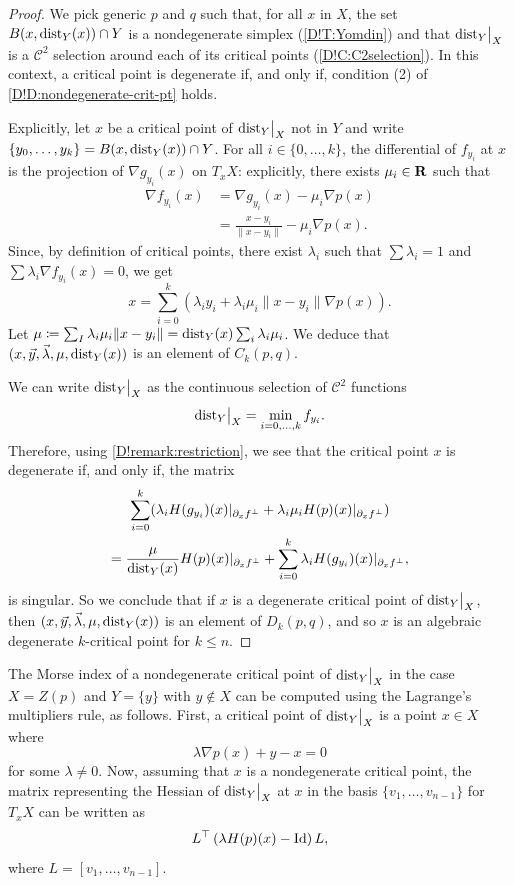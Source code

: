 \begin{proof}
  We pick generic $p$ and $q$ such that, for all $x$ in $X$, the set $B(x, \operatorname{dist}_Y(x)) \cap Y$ is a nondegenerate simplex (\cref{D!T:Yomdin}) and that $\mathord{\operatorname{dist}}_Y\big|_X$ is a $\mathcal{C}^2$ selection around each of its critical points (\cref{D!C:C2selection}). In this context, a critical point is degenerate if, and only if, condition (2) of \cref{D!D:nondegenerate-crit-pt} holds.

  Explicitly, let $x$ be a critical point of $\mathord{\operatorname{dist}}_Y\big|_X$ not in $Y$ and write $\{y_0, \ldots, y_k\} = B(x, \operatorname{dist}_Y(x)) \cap Y$. For all $i \in \{0, \ldots, k\}$, the differential of $f_{y_i}$ at $x$ is the projection of $\nabla g_{y_i}(x)$ on $T_x X$: explicitly, there exists $\mu_i \in \mathbf{R}$ such that
  \begin{align}
  \label{D!E:finding-mu}
    \nabla f_{y_i}(x) & = \nabla g_{y_i}(x) - \mu_i \nabla p(x) \\
    & = \frac{x - y_i}{\|x - y_i\|} - \mu_i \nabla p(x).
  \end{align}
  Since, by definition of critical points, there exist $\lambda_i$ such that $\sum \lambda_i = 1$ and $\sum \lambda_i \nabla f_{y_i}(x) = 0$, we get
  \[
    x = \sum_{i = 0}^k (\lambda_i y_i + \lambda_i \mu_i \|x - y_i\| \nabla p(x)).
  \]
  Let $\mu \coloneq \sum_I \lambda_i \mu_i \|x - y_i\| = \operatorname{dist}_Y(x) \sum_i \lambda_i \mu_i$. We deduce that $(x, \vec{y}, \vec{\lambda}, \mu, \operatorname{dist}_Y(x))$ is an element of $C_k(p, q)$.

  We can write $\mathord{\operatorname{dist}}_Y\big|_X$ as the continuous selection of $\mathcal{C}^2$ functions
  \[
    \mathord{\operatorname{dist}}_Y\big|_X = \min_{i = 0, \ldots, k} f_{y_i}.
  \]
  Therefore, using \cref{D!remark:restriction}, we see that the critical point $x$ is degenerate if, and only if, the matrix
  \begin{gather*}
    \sum_{i = 0}^k (\lambda_i H(g_{y_i})(x)|_{\partial_x f^\bot} + \lambda_i \mu_i H(p)(x)|_{\partial_x f^\bot}) \\
    = \frac{\mu}{\operatorname{dist}_Y(x)} H(p)(x)|_{\partial_x f^\bot} + \sum_{i = 0}^k \lambda_i H(g_{y_i})(x)|_{\partial_x f^\bot},
  \end{gather*}
  is singular. So we conclude that if $x$ is a degenerate critical point of $\mathord{\operatorname{dist}}_Y\big|_X$, then $(x, \vec{y}, \vec{\lambda}, \mu, \operatorname{dist}_Y(x))$ is an element of $D_k(p, q)$, and so $x$ is an algebraic degenerate $k$-critical point for $k \leq n$.
\end{proof}

\begin{remark}
  The Morse index of a nondegenerate critical point of $\mathord{\operatorname{dist}}_Y\big|_X$ in the case $X=Z(p)$ and $Y=\{y\}$ with $y \notin X$ can be computed using the Lagrange's multipliers rule, as follows. First, a critical point of $\mathord{\operatorname{dist}}_Y\big|_X$ is a point $x\in X$ where 
  \[
    \lambda \nabla p(x)+y-x=0
  \]
  for some $\lambda\neq 0$. Now, assuming that $x$ is a nondegenerate critical point, the matrix representing the Hessian of $\mathord{\operatorname{dist}}_Y\big|_X$ at $x$ in the basis $\{v_1, \ldots, v_{n - 1}\}$ for $T_xX$ can be written as
  \[
    L^\top\left(\lambda H(p)(x)-\operatorname{Id}\right)L,
  \]
  where $L=[v_1, \ldots, v_{n-1}]$.
\end{remark}


